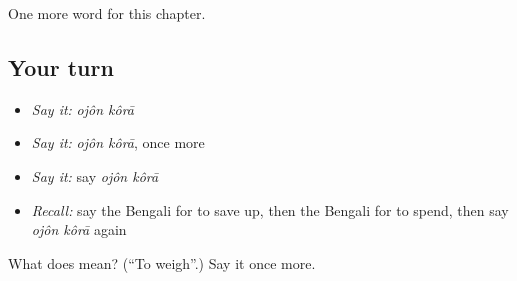 \begin{grammarlens}[title={What you've built}]
One more word for this chapter.
\end{grammarlens}

\subsection*{Your turn}
\begin{itemize}
\raggedright
  \item \emph{Say it:} \emph{ojôn kôrā}
  \item \emph{Say it:} \emph{ojôn kôrā}, once more
  \item \emph{Say it:} say \emph{ojôn kôrā}
  \item \emph{Recall:} say the Bengali for to save up, then the Bengali for to spend, then say \emph{ojôn kôrā} again
\end{itemize}

\begin{tcolorbox}[breakable,colback=teal!4,colframe=teal!35!black,title={Before you move on}]
What does   mean? (\textquotedblleft{}To weigh\textquotedblright{}.) Say it once more.
\end{tcolorbox}
